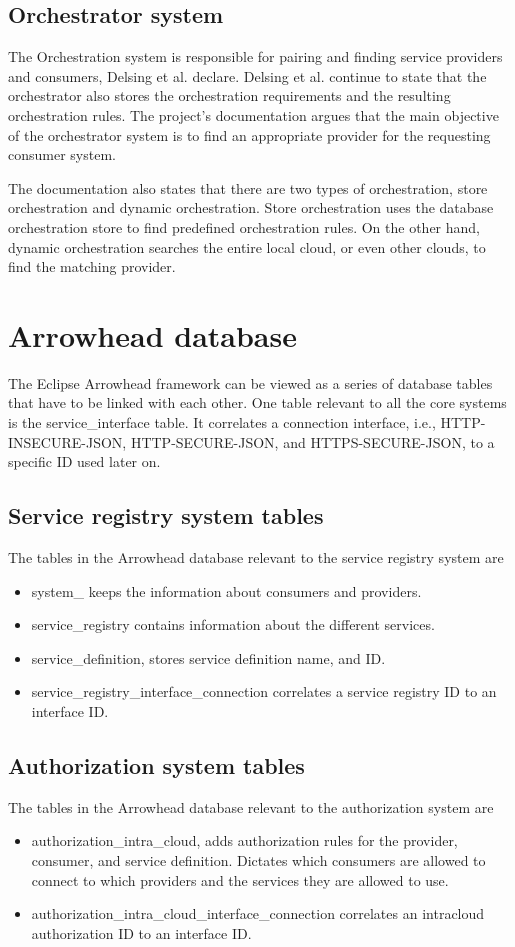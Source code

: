 \subsection{Orchestrator system}
The Orchestration system is responsible for pairing and finding service providers and consumers, Delsing et al. declare.
Delsing et al. continue to state that the orchestrator also stores the orchestration requirements and the resulting orchestration rules.\cite{Delsing2017} 
The project's documentation argues that the main objective of the orchestrator system is to find an appropriate provider for the requesting consumer system.\cite{Github2021}

The documentation also states that there are two types of orchestration, store orchestration and dynamic orchestration.
Store orchestration uses the database orchestration store to find predefined orchestration rules.
On the other hand, dynamic orchestration searches the entire local cloud, or even other clouds, to find the matching provider.\cite{Github2021}
\section{Arrowhead database}
The Eclipse Arrowhead framework can be viewed as a series of database tables that have to be linked with each other.
One table relevant to all the core systems is the service\_interface table.
It correlates a connection interface, i.e., HTTP-INSECURE-JSON, HTTP-SECURE-JSON, and HTTPS-SECURE-JSON, to a specific ID used later on.
\subsection{Service registry system tables}
The tables in the Arrowhead database relevant to the service registry system are
\begin{itemize}
    \item system\_ keeps the information about consumers and providers. 
    \item service\_registry contains information about the different services.
    \item service\_definition, stores service definition name, and ID.
    \item service\_registry\_interface\_connection correlates a service registry ID to an interface ID.
\end{itemize}
\subsection{Authorization system tables}
The tables in the Arrowhead database relevant to the authorization system are
\begin{itemize}
    \item authorization\_intra\_cloud,  adds authorization rules for the provider, consumer, and service definition. Dictates which consumers are allowed to connect to which providers and the services they are allowed to use.
    \item authorization\_intra\_cloud\_interface\_connection correlates an intracloud authorization ID to an interface ID.
\end{itemize}
